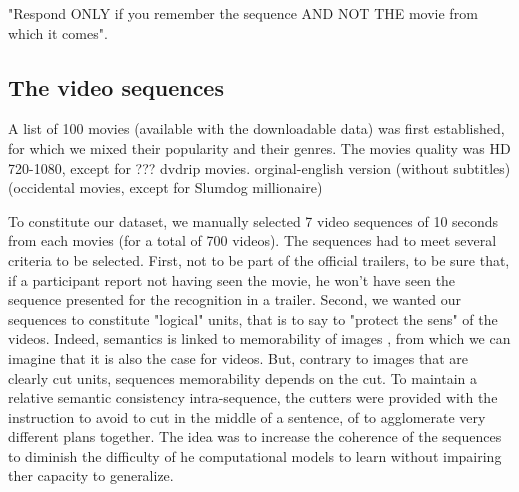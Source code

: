 \documentclass[sigconf]{acmart}
\begin{document}
"Respond ONLY if you remember the sequence AND NOT THE movie from which it comes".%

\subsection{The video sequences}
A list of 100 movies (available with the downloadable data) was first established, for which we mixed their popularity and their genres.
The movies quality was HD 720-1080, except for ??? dvdrip movies.
orginal-english version (without subtitles) (occidental movies, except for Slumdog millionaire) %

To constitute our dataset, we manually selected 7 video sequences of 10 seconds from each movies (for a total of 700 videos).
The sequences had to meet several criteria to be selected.
First, not to be part of the official trailers, to be sure that, if a participant report not having seen the movie, he won't have seen the sequence presented for the recognition in a trailer.
Second, we wanted our sequences to constitute "logical" units, that is to say to "protect the sens" of the videos. Indeed, semantics is linked to memorability of images \cite{isola_2014_makes}, from which we can imagine that it is also the case for videos. But, contrary to images that are clearly cut units, sequences memorability depends on the cut. To maintain a relative semantic consistency intra-sequence, the cutters were provided with the instruction to avoid to cut in the middle of a sentence, of to agglomerate very different plans together. The idea was to increase the coherence of the sequences to diminish the difficulty of he computational models to learn without impairing ther capacity to generalize.
\end{document}

